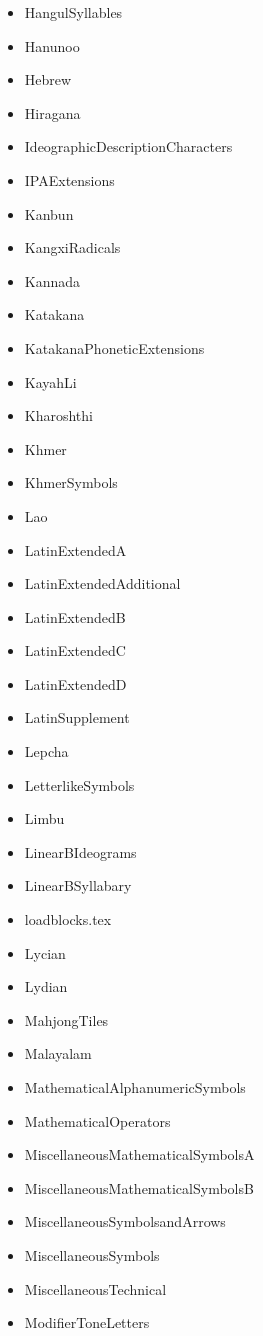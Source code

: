 \documentclass{article}
\newenvironment{itemlist}{%
  \begin{itemize}
	\setlength{\itemsep}{0pt}
	\setlength{\parsep}{0pt}
	\setlength{\topsep}{0pt}
	\setlength{\partopsep}{0pt}
	\setlength{\parskip}{0pt}
	\setlength{\labelsep}{5pt}}%
{
  \end{itemize}}
\begin{document}
\begin{multicols}{2}
\begin{itemlist}
				\item HangulSyllables
				\item Hanunoo
				\item Hebrew
				\item Hiragana
				\item IdeographicDescriptionCharacters
				\item IPAExtensions
				\item Kanbun
				\item KangxiRadicals
				\item Kannada
				\item Katakana
				\item KatakanaPhoneticExtensions
				\item KayahLi
				\item Kharoshthi
				\item Khmer
				\item KhmerSymbols
				\item Lao
				\item LatinExtendedA
				\item LatinExtendedAdditional
				\item LatinExtendedB
				\item LatinExtendedC
				\item LatinExtendedD
				\item LatinSupplement
				\item Lepcha
				\item LetterlikeSymbols
				\item Limbu
				\item LinearBIdeograms
				\item LinearBSyllabary
				\item loadblocks.tex
				\item Lycian
				\item Lydian
				\item MahjongTiles
				\item Malayalam
				\item MathematicalAlphanumericSymbols
				\item MathematicalOperators
				\item MiscellaneousMathematicalSymbolsA
				\item MiscellaneousMathematicalSymbolsB
				\item MiscellaneousSymbolsandArrows
				\item MiscellaneousSymbols
				\item MiscellaneousTechnical
				\item ModifierToneLetters

\end{itemlist}
\end{multicols}
\end{document}
